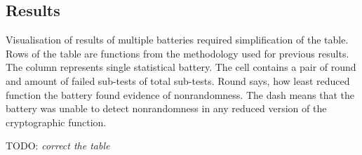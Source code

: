 \documentclass[
  print, %
  Table,   %
  nolof,     %
  nolot,     %
  11pt, %
  oneside  %
]{fithesis3}
\newcommand{\todo}[1]{TODO: \textit{#1}}
\begin{document}
\subsection{Results}
\label{subsec:relatwork-stat-res}

Visualisation of results of multiple batteries required simplification of the table. Rows of the table are functions from the methodology used for previous results. The column represents single statistical battery. The cell contains a pair of round and amount of failed sub-tests of total sub-tests. Round says, how least reduced function the battery found evidence of nonrandomness. The dash means that the battery was unable to detect nonrandomness in any reduced version of the cryptographic function.

\todo{correct the table}
\end{document}
